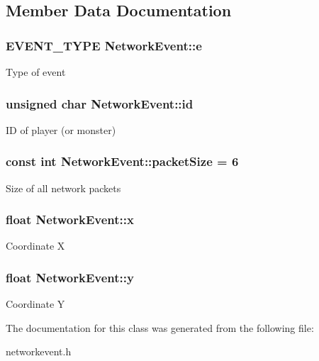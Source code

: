 \subsection{Member Data Documentation}
\hypertarget{class_network_event_a0f46f7a2c2876d3af113b5b50df06426}{
\subsubsection[{e}]{\setlength{\rightskip}{0pt plus 5cm}E\-V\-E\-N\-T\-\_\-\-T\-Y\-P\-E Network\-Event\-::e}}\label{class_network_event_a0f46f7a2c2876d3af113b5b50df06426}
Type of event \hypertarget{class_network_event_ac223ce8828eba29110147ed7a5a7d76b}{
\subsubsection[{id}]{\setlength{\rightskip}{0pt plus 5cm}unsigned char Network\-Event\-::id}}\label{class_network_event_ac223ce8828eba29110147ed7a5a7d76b}
I\-D of player (or monster) \hypertarget{class_network_event_a174f204e98eb4fd4fb442b9166208986}{
\subsubsection[{packet\-Size}]{\setlength{\rightskip}{0pt plus 5cm}const int Network\-Event\-::packet\-Size = 6\hspace{0.3cm}{\ttfamily [static]}}}\label{class_network_event_a174f204e98eb4fd4fb442b9166208986}
Size of all network packets \hypertarget{class_network_event_ab847bb49581f345b762ba702fe41d505}{
\subsubsection[{x}]{\setlength{\rightskip}{0pt plus 5cm}float Network\-Event\-::x}}\label{class_network_event_ab847bb49581f345b762ba702fe41d505}
Coordinate X \hypertarget{class_network_event_ac12a2de372b8b3604b0f862a7e56e7dc}{
\subsubsection[{y}]{\setlength{\rightskip}{0pt plus 5cm}float Network\-Event\-::y}}\label{class_network_event_ac12a2de372b8b3604b0f862a7e56e7dc}
Coordinate Y 

The documentation for this class was generated from the following file\-:\begin{DoxyCompactItemize}
\item 
networkevent.\-h\end{DoxyCompactItemize}
